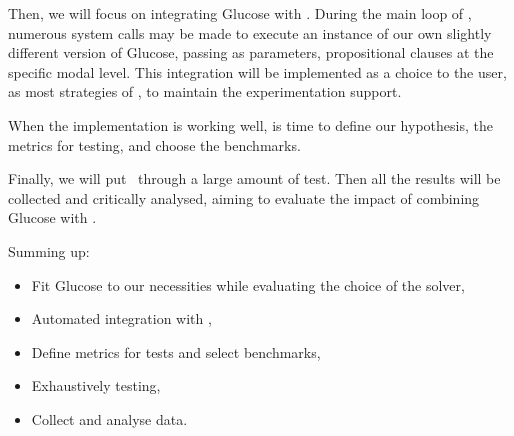 Then, we will focus on integrating Glucose with \ksp. During the main
loop of \ksp, numerous system calls may be made to execute an instance of our
own slightly different version of Glucose, passing as parameters, propositional
clauses at the specific modal level. This integration will be implemented as a
choice to the user, as most strategies of \ksp, to maintain the experimentation
support.

When the implementation is working well, is time to define our hypothesis, the
metrics for testing, and choose the benchmarks.

Finally, we will put \ksp~through a large amount of test. Then all the results
will be collected and critically analysed, aiming to evaluate the impact of
combining Glucose with \ksp.

Summing up:
\begin{itemize}
    \item Fit Glucose to our necessities while evaluating the choice of the solver,
    \item Automated integration with \ksp,
    \item Define metrics for tests and select benchmarks,
    \item Exhaustively testing,
    \item Collect and analyse data.
\end{itemize}

